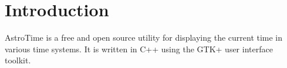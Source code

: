 \section{Introduction}
AstroTime is a free and open source utility for displaying the current time in various time systems. It is written in C++ using the GTK+ user interface toolkit.
